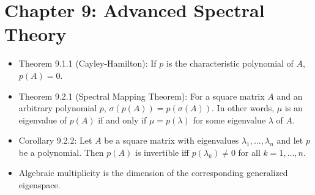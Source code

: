 \documentclass[../../notes.tex]{subfiles}
\begin{document}
\section{Chapter 9: Advanced Spectral Theory}
\begin{itemize}
    \item {}Theorem 9.1.1 (Cayley-Hamilton): If $p$ is the characteristic polynomial of $A$, $p(A)=0$.
    \item Theorem 9.2.1 (Spectral Mapping Theorem): For a square matrix $A$ and an arbitrary polynomial $p$, $\sigma(p(A))=p(\sigma(A))$. In other words, $\mu$ is an eigenvalue of $p(A)$ if and only if $\mu=p(\lambda)$ for some eigenvalue $\lambda$ of $A$.
    \item Corollary 9.2.2: Let $A$ be a square matrix with eigenvalues $\lambda_1,\dots,\lambda_n$ and let $p$ be a polynomial. Then $p(A)$ is invertible iff $p(\lambda_k)\neq 0$ for all $k=1,\dots,n$.
    \item Algebraic multiplicity is the dimension of the corresponding generalized eigenspace.
\end{itemize}
\end{document}
